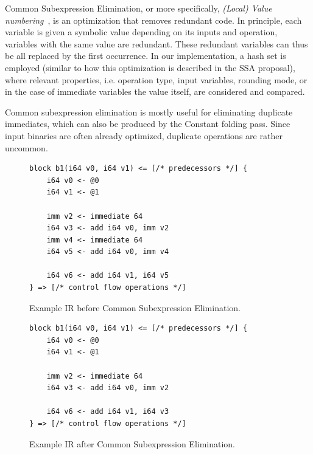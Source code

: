 \documentclass[course=eragp]{aspdoc}
\begin{document}
Common Subexpression Elimination, or more specifically, \textit{(Local) Value
    numbering}~\cite{ssa_proposal}, is an optimization that removes redundant code. In principle, each variable is given a
symbolic value depending on its inputs and operation, variables with the same value are redundant. These redundant
variables can thus be all replaced by the first occurrence. In our implementation, a hash set is employed (similar to
how this optimization is described in the SSA proposal), where relevant properties, i.e. operation type, input
variables, rounding mode, or in the case of immediate variables the value itself, are considered and compared.

Common subexpression elimination is mostly useful for eliminating duplicate immediates, which can also be produced by
the Constant folding pass. Since input binaries are often already optimized, duplicate operations are rather uncommon.

\begin{figure}[H]
    \centering
    \begin{lstlisting}[]
block b1(i64 v0, i64 v1) <= [/* predecessors */] {
    i64 v0 <- @0
    i64 v1 <- @1

    imm v2 <- immediate 64
    i64 v3 <- add i64 v0, imm v2
    imm v4 <- immediate 64
    i64 v5 <- add i64 v0, imm v4

    i64 v6 <- add i64 v1, i64 v5
} => [/* control flow operations */]
\end{lstlisting}
    \caption{Example IR before Common Subexpression Elimination.}\label{fig:cse_example_before}
\end{figure}

\begin{figure}[H]
    \centering
    \begin{lstlisting}[]
block b1(i64 v0, i64 v1) <= [/* predecessors */] {
    i64 v0 <- @0
    i64 v1 <- @1

    imm v2 <- immediate 64
    i64 v3 <- add i64 v0, imm v2

    i64 v6 <- add i64 v1, i64 v3
} => [/* control flow operations */]
\end{lstlisting}
    \caption{Example IR after Common Subexpression Elimination.}\label{fig:cse_example_after}
\end{figure}
\end{document}
